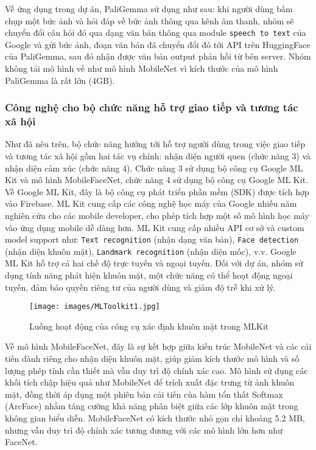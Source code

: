 \documentclass[a4paper,12pt]{article}
\begin{document}
Về ứng dụng trong dự án, PaliGemma sử dụng như sau: khi người dùng bấm chụp một bức ảnh và hỏi đáp về bức ảnh thông qua kênh âm thanh, nhóm sẽ chuyển đổi câu hỏi đó qua dạng văn bản thông qua module \texttt{speech to text} của Google và gửi bức ảnh, đoạn văn bản đã chuyển đổi đó tới API trên HuggingFace của PaliGemma, sau đó nhận được văn bản output phản hồi từ bên server. Nhóm không tải mô hình về như mô hình MobileNet vì kích thước của mô hình PaliGemma là rất lớn (4GB).

\subsubsection{Công nghệ cho bộ chức năng hỗ trợ giao tiếp và tương tác xã hội}
Như đã nêu trên, bộ chức năng hướng tới hỗ trợ người dùng trong việc giao tiếp và tương tác xã hội gồm hai tác vụ chính: nhận diện người quen (chức năng 3) và nhận diện cảm xúc (chức năng 4). Chức năng 3 sử dụng bộ công cụ Google ML Kit và mô hình MobileFaceNet, chức năng 4 sử dụng bộ công cụ Google ML Kit. 
\\
Về Google ML Kit, đây là bộ công cụ phát triển phần mềm (SDK) được tích hợp vào Firebase. ML Kit cung cấp các công nghệ học máy của Google nhiều năm nghiên cứu cho các mobile developer, cho phép tích hợp một số mô hình học máy vào ứng dụng mobile dễ dàng hơn. ML Kit cung cấp nhiều API cơ sở và custom model support như: \texttt{Text recognition} (nhận dạng văn bản), \texttt{Face detection} (nhận diện khuôn mặt), \texttt{Landmark recognition} (nhận diện mốc), v.v. Google ML Kit hỗ trợ cả hai chế độ trực tuyến và ngoại tuyến. Đối với dự án, nhóm sử dụng tính năng phát hiện khuôn mặt, một chức năng có thể hoạt động ngoại tuyến, đảm bảo quyền riêng tư của người dùng và giảm độ trễ khi xử lý.

\begin{figure}[H]
    \centering
    \texttt{[image: images/MLToolkit1.jpg]}
    \caption{Luồng hoạt động của công cụ xác định khuôn mặt trong MLKit}
    \label{fig:enter-label}
\end{figure}

Về mô hình MobileFaceNet, đây là sự kết hợp giữa kiến trúc MobileNet và các cải tiến dành riêng cho nhận diện khuôn mặt, giúp giảm kích thước mô hình và số lượng phép tính cần thiết mà vẫn duy trì độ chính xác cao. Mô hình sử dụng các khối tích chập hiệu quả như MobileNet để trích xuất đặc trưng từ ảnh khuôn mặt, đồng thời áp dụng một phiên bản cải tiến của hàm tổn thất Softmax (ArcFace) nhằm tăng cường khả năng phân biệt giữa các lớp khuôn mặt trong không gian biểu diễn. MobileFaceNet có kích thước nhỏ gọn chỉ khoảng 5.2 MB, nhưng vẫn duy trì độ chính xác tương đương với các mô hình lớn hơn như FaceNet.
\end{document}
